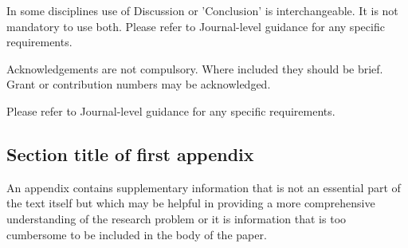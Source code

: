 \documentclass[sn-mathphys-num]{sn-jnl}%
\theoremstyle{thmstyleone}%
\theoremstyle{thmstyletwo}%
\theoremstyle{thmstylethree}%
\begin{document}
In some disciplines use of Discussion or 'Conclusion' is interchangeable. It is not mandatory to use both. Please refer to Journal-level guidance for any specific requirements. 

\backmatter


Acknowledgements are not compulsory. Where included they should be brief. Grant or contribution numbers may be acknowledged.

Please refer to Journal-level guidance for any specific requirements.

\begin{appendices}

\section{Section title of first appendix}\label{secA1}

An appendix contains supplementary information that is not an essential part of the text itself but which may be helpful in providing a more comprehensive understanding of the research problem or it is information that is too cumbersome to be included in the body of the paper.




\end{appendices}


\end{document}
